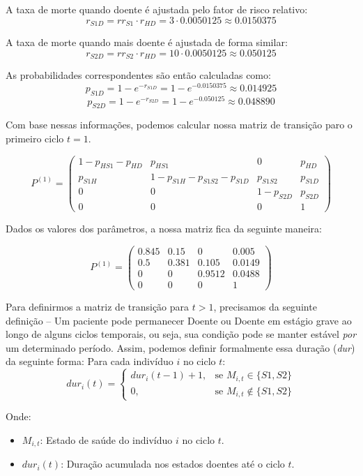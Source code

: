 \documentclass[12pt]{article}
\theoremstyle{break}
\begin{document}
A taxa de morte quando doente é ajustada pelo fator de risco relativo:
\[
r_{S1D} = rr_{S1} \cdot r_{HD} = 3 \cdot 0.0050125 \approx 0.0150375
\]

A taxa de morte quando mais doente é ajustada de forma similar:
\[
r_{S2D} = rr_{S2} \cdot r_{HD} = 10 \cdot 0.0050125 \approx 0.050125
\]

As probabilidades correspondentes são então calculadas como:
\[
p_{S1D} = 1 - e^{-r_{S1D}} = 1 - e^{-0.0150375} \approx 0.014925
\]
\[
p_{S2D} = 1 - e^{-r_{S2D}} = 1 - e^{-0.050125} \approx 0.048890
\]



Com base nessas informações, podemos calcular nossa matriz de transição paro o primeiro ciclo $t = 1$.



\[
P^{(1)} =
\begin{pmatrix}
1 - p_{HS1} - p_{HD} & p_{HS1} & 0 & p_{HD} \\
p_{S1H} & 1 - p_{S1H} - p_{S1S2} - p_{S1D} & p_{S1S2} & p_{S1D} \\
0 & 0 & 1 - p_{S2D} & p_{S2D} \\
0 & 0 & 0 & 1
\end{pmatrix}
\]


Dados os valores dos parâmetros, a nossa matriz fica da seguinte maneira:


\[
P^{(1)} = \begin{pmatrix}
0.845 & 0.15 & 0 & 0.005 \\
0.5 & 0.381 & 0.105 & 0.0149 \\
0 & 0 & 0.9512 & 0.0488 \\
0 & 0 & 0 & 1
\end{pmatrix}
\]


Para definirmos a matriz de transição para $t>1$, precisamos da seguinte definição --  Um paciente pode permanecer Doente ou Doente em estágio grave ao longo de alguns ciclos temporais, ou seja, sua condição pode se manter estável \emph{por} um determinado período. Assim, podemos definir formalmente essa duração (\emph{dur}) da seguinte forma: 
Para cada indivíduo \( i \) no ciclo \( t \):
\[
dur_i(t) =
\begin{cases}
    dur_i(t-1) + 1, & \text{se } M_{i,t} \in \{S1, S2\} \\
    0, & \text{se } M_{i,t} \notin \{S1, S2\}
\end{cases}
\]

Onde:
\begin{itemize}
    \item \( M_{i,t} \): Estado de saúde do indivíduo \( i \) no ciclo \( t \).
    \item \( dur_i(t) \): Duração acumulada nos estados doentes até o ciclo \( t \).
\end{itemize}
\end{document}
